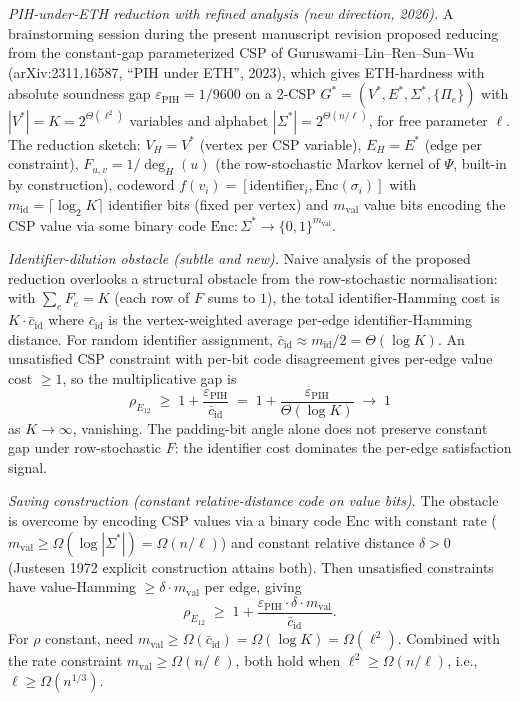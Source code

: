 \documentclass[
]{article}
\begin{document}
\begin{itemize}
  \emph{PIH-under-ETH reduction with refined analysis (new direction,
  2026).} A brainstorming session during the present manuscript
  revision proposed reducing from the constant-gap parameterized
  CSP of Guruswami--Lin--Ren--Sun--Wu (arXiv:2311.16587, ``PIH under
  ETH'', 2023), which gives ETH-hardness with absolute soundness gap
  $\varepsilon_{\mathrm{PIH}} = 1/9600$ on a 2-CSP $G^* = (V^*, E^*,
  \Sigma^*, \{\Pi_e\})$ with $|V^*| = K = 2^{\Theta(\ell^2)}$ variables
  and alphabet $|\Sigma^*| = 2^{\Theta(n/\ell)}$, for free parameter
  $\ell$. The reduction sketch: $V_H = V^*$ (vertex per CSP variable),
  $E_H = E^*$ (edge per constraint), $F_{u, v} = 1/\deg_H(u)$ (the
  row-stochastic Markov kernel of $\Psi$, built-in by construction),
  codeword $f(v_i) = [\mathrm{identifier}_i, \mathrm{Enc}(\sigma_i)]$
  with $m_{\mathrm{id}} = \lceil \log_2 K \rceil$ identifier bits
  (fixed per vertex) and $m_{\mathrm{val}}$ value bits encoding the
  CSP value via some binary code $\mathrm{Enc} : \Sigma^* \to
  \{0, 1\}^{m_{\mathrm{val}}}$.

  \emph{Identifier-dilution obstacle (subtle and new).} Naive analysis
  of the proposed reduction overlooks a structural obstacle from the
  row-stochastic normalisation: with $\sum_e F_e = K$ (each row of $F$
  sums to $1$), the total identifier-Hamming cost is $K \cdot \bar{c}_{\mathrm{id}}$
  where $\bar{c}_{\mathrm{id}}$ is the vertex-weighted average per-edge
  identifier-Hamming distance. For random identifier assignment,
  $\bar{c}_{\mathrm{id}} \approx m_{\mathrm{id}}/2 = \Theta(\log K)$.
  An unsatisfied CSP constraint with per-bit code disagreement gives
  per-edge value cost $\geq 1$, so the multiplicative gap is
  \[
  \rho_{E_{12}} \;\geq\; 1 + \frac{\varepsilon_{\mathrm{PIH}}}{\bar{c}_{\mathrm{id}}}
  \;=\; 1 + \frac{\varepsilon_{\mathrm{PIH}}}{\Theta(\log K)} \;\to\; 1
  \]
  as $K \to \infty$, vanishing. The padding-bit angle alone does not
  preserve constant gap under row-stochastic $F$: the identifier cost
  dominates the per-edge satisfaction signal.

  \emph{Saving construction (constant relative-distance code on value
  bits).} The obstacle is overcome by encoding CSP values via a
  binary code $\mathrm{Enc}$ with constant rate ($m_{\mathrm{val}}
  \geq \Omega(\log |\Sigma^*|) = \Omega(n/\ell)$) and constant
  relative distance $\delta > 0$ (Justesen 1972 explicit construction
  attains both). Then unsatisfied constraints have value-Hamming
  $\geq \delta \cdot m_{\mathrm{val}}$ per edge, giving
  \[
  \rho_{E_{12}} \;\geq\; 1 + \frac{\varepsilon_{\mathrm{PIH}} \cdot \delta \cdot m_{\mathrm{val}}}{\bar{c}_{\mathrm{id}}}.
  \]
  For $\rho$ constant, need $m_{\mathrm{val}} \geq \Omega(\bar{c}_{\mathrm{id}})
  = \Omega(\log K) = \Omega(\ell^2)$. Combined with the rate constraint
  $m_{\mathrm{val}} \geq \Omega(n/\ell)$, both hold when $\ell^2 \geq
  \Omega(n/\ell)$, i.e., $\ell \geq \Omega(n^{1/3})$.


\end{itemize}
\end{document}
